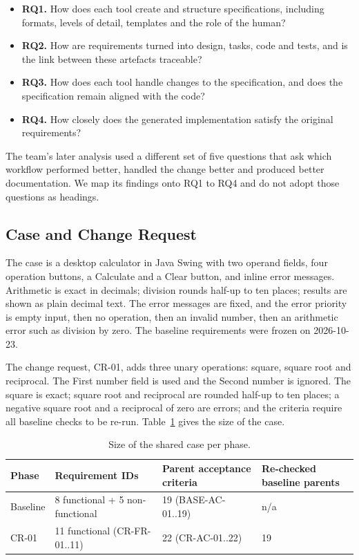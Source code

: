 \documentclass[conference]{IEEEtran}
\providecommand{\tightlist}{\setlength{\itemsep}{0pt}\setlength{\parskip}{0pt}}
\begin{document}
\begin{itemize}
\tightlist
\item
  \textbf{RQ1.} How does each tool create and structure specifications,
  including formats, levels of detail, templates and the role of the
  human?
\item
  \textbf{RQ2.} How are requirements turned into design, tasks, code and
  tests, and is the link between these artefacts traceable?
\item
  \textbf{RQ3.} How does each tool handle changes to the specification,
  and does the specification remain aligned with the code?
\item
  \textbf{RQ4.} How closely does the generated implementation satisfy
  the original requirements?
\end{itemize}

The team's later analysis used a different set of five questions that
ask which workflow performed better, handled the change better and
produced better documentation. We map its findings onto RQ1 to RQ4 and
do not adopt those questions as headings.

\subsection{Case and Change Request}\label{case-and-change-request}

The case is a desktop calculator in Java Swing with two operand fields,
four operation buttons, a Calculate and a Clear button, and inline error
messages. Arithmetic is exact in decimals; division rounds half-up to
ten places; results are shown as plain decimal text. The error messages
are fixed, and the error priority is empty input, then no operation,
then an invalid number, then an arithmetic error such as division by
zero. The baseline requirements were frozen on 2026-10-23.

The change request, CR-01, adds three unary operations: square, square
root and reciprocal. The First number field is used and the Second
number is ignored. The square is exact; square root and reciprocal are
rounded half-up to ten places; a negative square root and a reciprocal
of zero are errors; and the criteria require all baseline checks to be
re-run. Table~\ref{tbl-case} gives the size of the case.

\begin{table}[htbp]
\caption{Size of the shared case per phase.}\label{tbl-case}
\centering\footnotesize
\begin{tabular}{p{} p{} p{} p{}}
\hline
\textbf{Phase} & \textbf{Requirement IDs} & \textbf{Parent acceptance criteria} & \textbf{Re-checked baseline parents} \\
\hline
Baseline & 8 functional + 5 non-functional & 19 (BASE-AC-01..19) & n/a \\
CR-01 & 11 functional (CR-FR-01..11) & 22 (CR-AC-01..22) & 19 \\
\hline
\end{tabular}
\end{table}
\end{document}
